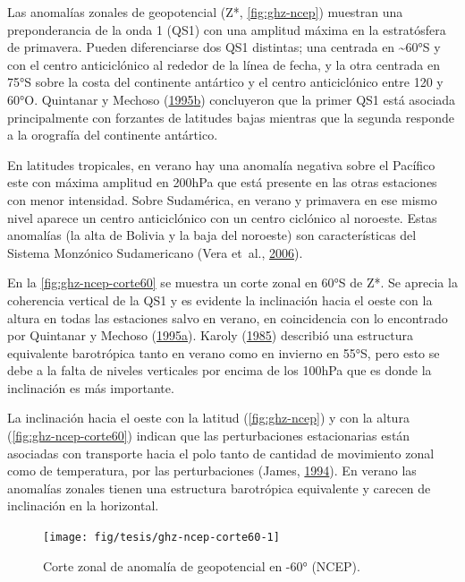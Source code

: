 \documentclass[spanish,a4paper,12pt,oneside]{book}
\begin{document}
Las anomalías zonales de geopotencial (Z*, \autoref{fig:ghz-ncep})
muestran una preponderancia de la onda 1 (QS1) con una amplitud máxima
en la estratósfera de primavera. Pueden diferenciarse dos QS1 distintas;
una centrada en \textasciitilde{}60°S y con el centro anticiclónico al
rededor de la línea de fecha, y la otra centrada en 75°S sobre la costa
del continente antártico y el centro anticiclónico entre 120 y 60°O.
Quintanar y Mechoso
(\protect\hyperlink{ref-Quintanar1995}{1995}\protect\hyperlink{ref-Quintanar1995}{b})
concluyeron que la primer QS1 está asociada principalmente con forzantes
de latitudes bajas mientras que la segunda responde a la orografía del
continente antártico.

En latitudes tropicales, en verano hay una anomalía negativa sobre el
Pacífico este con máxima amplitud en 200hPa que está presente en las
otras estaciones con menor intensidad. Sobre Sudamérica, en verano y
primavera en ese mismo nivel aparece un centro anticiclónico con un
centro ciclónico al noroeste. Estas anomalías (la alta de Bolivia y la
baja del noroeste) son características del Sistema Monzónico
Sudamericano (Vera et~al., \protect\hyperlink{ref-Vera2006}{2006}).

En la \autoref{fig:ghz-ncep-corte60} se muestra un corte zonal en 60°S
de Z*. Se aprecia la coherencia vertical de la QS1 y es evidente la
inclinación hacia el oeste con la altura en todas las estaciones salvo
en verano, en coincidencia con lo encontrado por Quintanar y Mechoso
(\protect\hyperlink{ref-Quintanar1995a}{1995}\protect\hyperlink{ref-Quintanar1995a}{a}).
Karoly (\protect\hyperlink{ref-Karoly1985}{1985}) describió una
estructura equivalente barotrópica tanto en verano como en invierno en
55°S, pero esto se debe a la falta de niveles verticales por encima de
los 100hPa que es donde la inclinación es más importante.

La inclinación hacia el oeste con la latitud (\autoref{fig:ghz-ncep}) y
con la altura (\autoref{fig:ghz-ncep-corte60}) indican que las
perturbaciones estacionarias están asociadas con transporte hacia el
polo tanto de cantidad de movimiento zonal como de temperatura, por las
perturbaciones (James, \protect\hyperlink{ref-James}{1994}). En verano
las anomalías zonales tienen una estructura barotrópica equivalente y
carecen de inclinación en la horizontal.

\begin{figure}
\texttt{[image: fig/tesis/ghz-ncep-corte60-1]} \caption{Corte zonal de anomalía de geopotencial en -60° (NCEP).}\label{fig:ghz-ncep-corte60}
\end{figure}
\end{document}

